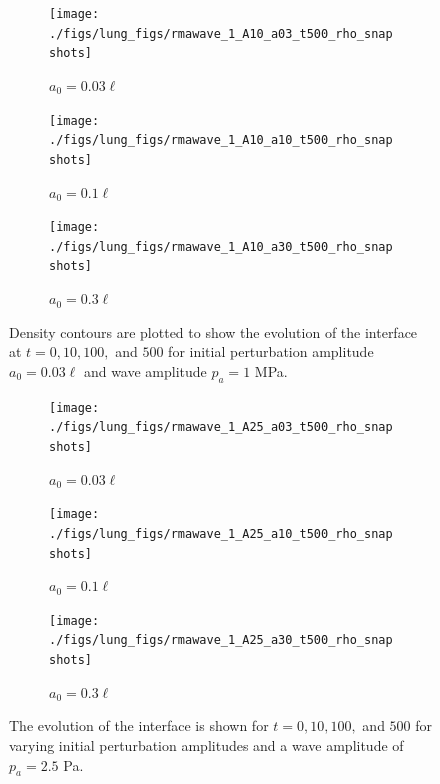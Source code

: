 \begin{figure}
  \vspace*{-0.5cm}
  \centering
  \begin{subfigure}[b]{0.9\textwidth}
    \texttt{[image: ./figs/lung\_figs/rmawave\_1\_A10\_a03\_t500\_rho\_snapshots]}
    \caption{\label{fig:rho_snapshot_03} $a_0 = 0.03\ell$}
  \end{subfigure}
  \begin{subfigure}[b]{0.9\textwidth}
    \texttt{[image: ./figs/lung\_figs/rmawave\_1\_A10\_a10\_t500\_rho\_snapshots]}
    \caption{\label{fig:rho_snapshot_10} $a_0 = 0.1\ell$}
  \end{subfigure}
  \begin{subfigure}[b]{0.9\textwidth}
    \texttt{[image: ./figs/lung\_figs/rmawave\_1\_A10\_a30\_t500\_rho\_snapshots]}
    \caption{\label{fig:rho_snapshot_30} $a_0 = 0.3\ell$}
  \end{subfigure}
  
  \caption{Density contours are plotted to show the evolution of the interface at $t=0, 10, 100,$
    and $500$ for initial perturbation amplitude $a_0 = 0.03\ell$ and wave amplitude $p_a=1$ MPa.}
  \label{fig:rho_snapshots_A10}
\end{figure}
%
%
\begin{figure}
  \vspace*{-0.5cm}
  \centering
  \begin{subfigure}[b]{0.9\textwidth}
    \texttt{[image: ./figs/lung\_figs/rmawave\_1\_A25\_a03\_t500\_rho\_snapshots]}
    \caption{\label{fig:rho_snapshot_03} $a_0 = 0.03\ell$}
  \end{subfigure}
  \begin{subfigure}[b]{0.9\textwidth}
    \texttt{[image: ./figs/lung\_figs/rmawave\_1\_A25\_a10\_t500\_rho\_snapshots]}
    \caption{\label{fig:rho_snapshot_10} $a_0 = 0.1\ell$}
  \end{subfigure}
  \begin{subfigure}[b]{0.9\textwidth}
    \texttt{[image: ./figs/lung\_figs/rmawave\_1\_A25\_a30\_t500\_rho\_snapshots]}
    \caption{\label{fig:rho_snapshot_30} $a_0 = 0.3\ell$}
  \end{subfigure}
  \caption{The evolution of the interface is shown for $t=0, 10, 100,$
    and $500$ for varying initial perturbation amplitudes and a wave amplitude of $p_a=2.5$ Pa.}
  \label{fig:rho_snapshots_A25}
\end{figure}
%

